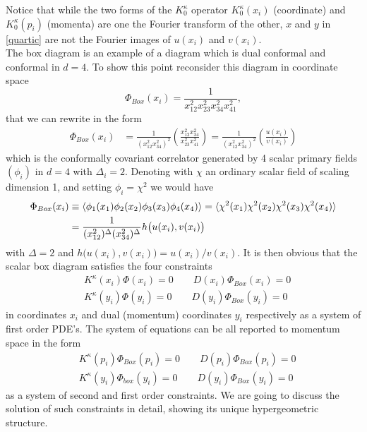 \documentclass[a4paper,11pt,openright,twoside]{book}
\numberwithin{equation}{section}
\begin{document}
{Notice that while the two forms of the $K_0^\kappa$ operator $K_0^\kappa(x_i)$ (coordinate) and $K_0^\kappa(p_i)$ (momenta) are one the Fourier transform of the other, $x$ and $y$ in \eqref{quartic} are not the Fourier images of $u(x_i)$ and $v(x_i)$. \\
The box diagram is an example of a diagram which is dual conformal and conformal in $d=4$.  To show this point reconsider this diagram in coordinate space
\begin{equation}
	\Phi_{Box}(x_i)=\frac{1}{x_{12}^2 x_{23}^2 x_{34}^2 x_{41}^2},
\end{equation}
that we can rewrite in the form 
\begin{align}
	\label{dccc}
	\Phi_{Box}(x_i)&=\frac{1}{(x_{12}^2 x_{34}^2)^2}\left(\frac{x_{12}^2 x_{34}^2}{x_{23}^2 x_{41}^2}\right)=\frac{1}{(x_{12}^2 x_{34}^2)^2}\left( \frac{u(x_i)}{v(x_i)}\right)
\end{align}
which is the conformally covariant correlator generated by 4 scalar primary fields $(\phi_i)$ in $d=4$ with $\Delta_i=2$. Denoting with $\chi$ an ordinary scalar field of scaling dimension 1, and setting $\phi_i=\chi^2$
we would have 
\begin{align}
	\Phi_{Box}(x_i)&\equiv \langle \phi_1(x_1)\phi_2(x_2)\phi_3(x_3)\phi_4(x_4)\rangle = \langle \chi^2(x_1)\chi^2(x_2)\chi^2(x_3)\chi^2(x_4)\rangle \notag\\
	&= \frac{1}{(x_{12}^{2})^\Delta (x_{34}^2)^\Delta}h\big(u(x_i),v(x_i)\big)
\end{align}
with $\Delta=2$ and $h\big(u(x_i),v(x_i)\big)=u(x_i)/v(x_i)$. It is then obvious that the scalar box diagram satisfies the four constraints 
\begin{eqnarray}
	& K^\kappa(x_i) \Phi(x_i)=0\qquad  D(x_i)\Phi_{Box}(x_i)=0\\
	& K^\kappa(y_i) \Phi(y_i)=0\qquad  D(y_i)\Phi_{Box}(y_i)=0
\end{eqnarray}
in coordinates $x_i$ and dual (momentum) coordinates $y_i$ respectively as a system of first order PDE's. The system of equations can be all reported to momentum space in the form
\begin{align}
	& K^\kappa(p_i) \Phi_{Box}(p_i)=0\qquad  D(p_i)\Phi_{Box}(p_i)=0\\
	& K^\kappa(y_i) \Phi_{box}(y_i)=0\qquad  D(y_i)\Phi_{Box}(y_i)=0
\end{align}
as a system of second and first order constraints. 
We are going to discuss the solution of such constraints in detail, showing its unique hypergeometric structure.
}
\end{document}
